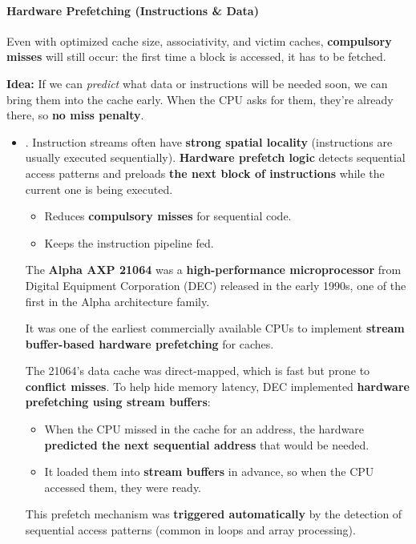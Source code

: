 \paragraph{Hardware Prefetching (Instructions \& Data)}\label{paragraph: Hardware Prefetching}

Even with optimized cache size, associativity, and victim caches, \textbf{compulsory misses} will still occur: the first time a block is accessed, it has to be fetched.

\highspace
\textbf{Idea:} If we can \emph{predict} what data or instructions will be needed soon, we can bring them into the cache early. When the CPU asks for them, they're already there, so \textbf{no miss penalty}.
\begin{itemize}
    \item {}. Instruction streams often have \textbf{strong spatial locality} (instructions are usually executed sequentially). \textbf{Hardware prefetch logic} detects sequential access patterns and preloads \textbf{the next block of instructions} while the current one is being executed.

    \begin{itemize}
        \item[\textcolor{Green3}{\faIcon{check}}] Reduces \textbf{compulsory misses} for sequential code.
        \item[\textcolor{Green3}{\faIcon{check}}] Keeps the instruction pipeline fed.
    \end{itemize}

    \begin{examplebox}
        The \textbf{Alpha AXP 21064} was a \textbf{high-performance microprocessor} from Digital Equipment Corporation (DEC) released in the early 1990s, one of the first in the Alpha architecture family.

        \highspace
        It was one of the earliest commercially available CPUs to implement \textbf{stream buffer-based hardware prefetching} for caches.

        \highspace
        The 21064's data cache was direct-mapped, which is fast but prone to \textbf{conflict misses}. To help hide memory latency, DEC implemented \textbf{hardware prefetching using stream buffers}:
        \begin{itemize}
            \item When the CPU missed in the cache for an address, the hardware \textbf{predicted the next sequential address} that would be needed.
            \item It loaded them into \textbf{stream buffers} in advance, so when the CPU accessed them, they were ready.
        \end{itemize}
        This prefetch mechanism was \textbf{triggered automatically} by the detection of sequential access patterns (common in loops and array processing).


\end{examplebox}
\end{itemize}
